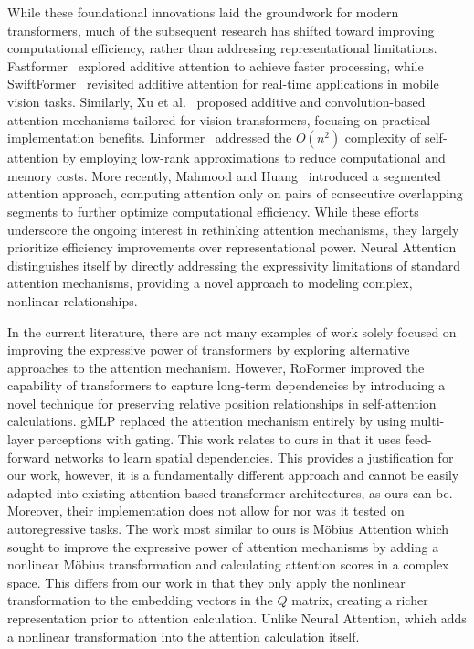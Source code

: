 While these foundational innovations laid the groundwork for modern transformers, much of the subsequent research has shifted toward improving computational efficiency, rather than addressing representational limitations. Fastformer~\cite{wu2021fastformer} explored additive attention to achieve faster processing, while SwiftFormer~\cite{shaker2023swiftformer} revisited additive attention for real-time applications in mobile vision tasks. Similarly, Xu et al.~\cite{zhang2024cas} proposed additive and convolution-based attention mechanisms tailored for vision transformers, focusing on practical implementation benefits. Linformer~\cite{wang2020linformer} addressed the $O(n^2)$ complexity of self-attention by employing low-rank approximations to reduce computational and memory costs. More recently, Mahmood and Huang~\cite{mahmood2024enhanced} introduced a segmented attention approach, computing attention only on pairs of consecutive overlapping segments to further optimize computational efficiency. While these efforts underscore the ongoing interest in rethinking attention mechanisms, they largely prioritize efficiency improvements over representational power. Neural Attention distinguishes itself by directly addressing the expressivity limitations of standard attention mechanisms, providing a novel approach to modeling complex, nonlinear relationships. 

In the current literature, there are not many examples of work solely focused on improving the expressive power of transformers by exploring alternative approaches to the attention mechanism. However, RoFormer \cite{su2024roformer} improved the capability of transformers to capture long-term dependencies by introducing a novel technique for preserving relative position relationships in self-attention calculations. gMLP \cite{liu2021pay} replaced the attention mechanism entirely by using multi-layer perceptions with gating. This work relates to ours in that it uses feed-forward networks to learn spatial dependencies. This provides a justification for our work, however, it is a fundamentally different approach and cannot be easily adapted into existing attention-based transformer architectures, as ours can be. Moreover, their implementation does not allow for nor was it tested on autoregressive tasks. The work most similar to ours is M{\"o}bius Attention \cite{halacheva2024expanding} which sought to improve the expressive power of attention mechanisms by adding a nonlinear M{\"o}bius transformation and calculating attention scores in a complex space. This differs from our work in that they only apply the nonlinear transformation to the embedding vectors in the $\mathit{Q}$ matrix, creating a richer representation prior to attention calculation. Unlike Neural Attention, which adds a nonlinear transformation into the attention calculation itself. 


